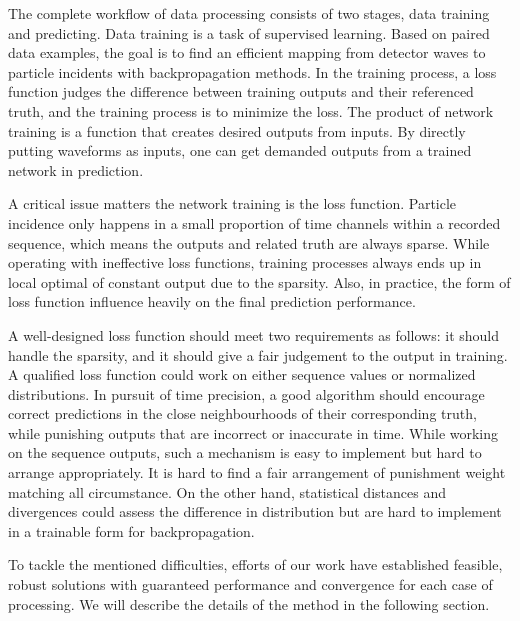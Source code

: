 
The complete workflow of data processing consists of two stages, data training and predicting. Data training is a task of supervised learning.  Based on paired data examples, the goal is to find an efficient mapping from detector waves to particle incidents with backpropagation methods. In the training process, a loss function judges the difference between training outputs and their referenced truth, and the training process is to minimize the loss. The product of network training is a function that creates desired outputs from inputs. By directly putting waveforms as inputs, one can get demanded outputs from a trained network in prediction.


A critical issue matters the network training is the loss function. Particle incidence only happens in a small proportion of time channels within a recorded sequence, which means the outputs and related truth are always sparse. While operating with ineffective loss functions, training processes always ends up in local optimal of constant output due to the sparsity. Also, in practice, the form of loss function influence heavily on the final prediction performance. 

A well-designed loss function should meet two requirements as follows: it should handle the sparsity, and it should give a fair judgement to the output in training. A qualified loss function could work on either sequence values or normalized distributions. In pursuit of time precision, a good algorithm should encourage correct predictions in the close neighbourhoods of their corresponding truth, while punishing outputs that are incorrect or inaccurate in time. While working on the sequence outputs, such a mechanism is easy to implement but hard to arrange appropriately. It is hard to find a fair arrangement of punishment weight matching all circumstance. On the other hand, statistical distances and divergences could assess the difference in distribution but are hard to implement in a trainable form for backpropagation. 

To tackle the mentioned difficulties, efforts of our work have established feasible, robust solutions with guaranteed performance and convergence for each case of processing. We will describe the details of the method in the following section.

